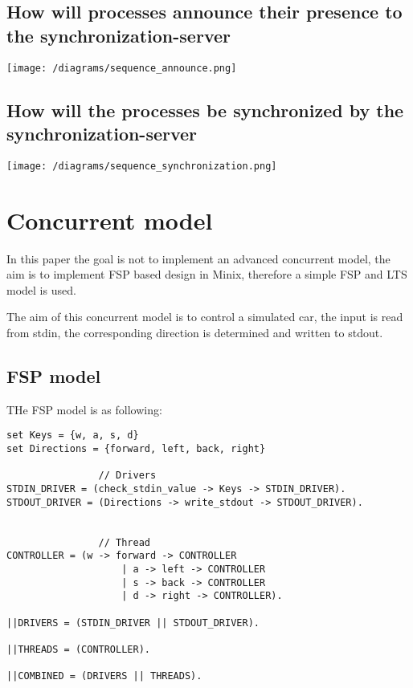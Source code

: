 \hypertarget{how-will-processes-announce-their-presence-to-the-synchronization-server}{%
\subsection{How will processes announce their presence to the
synchronization-server}\label{how-will-processes-announce-their-presence-to-the-synchronization-server}}

\texttt{[image: /diagrams/sequence\_announce.png]}

\hypertarget{how-will-the-processes-be-synchronized-by-the-synchronization-server}{%
\subsection{How will the processes be synchronized by the
synchronization-server}\label{how-will-the-processes-be-synchronized-by-the-synchronization-server}}

\texttt{[image: /diagrams/sequence\_synchronization.png]}

\hypertarget{concurrent-model}{%
\section{Concurrent model}\label{concurrent-model}}

In this paper the goal is not to implement an advanced concurrent model,
the aim is to implement FSP based design in Minix, therefore a simple
FSP and LTS model is used.

The aim of this concurrent model is to control a simulated car, the
input is read from stdin, the corresponding direction is determined and
written to stdout.

\hypertarget{fsp-model}{%
\subsection{FSP model}\label{fsp-model}}

THe FSP model is as following:

\begin{verbatim}
set Keys = {w, a, s, d}
set Directions = {forward, left, back, right} 

                // Drivers
STDIN_DRIVER = (check_stdin_value -> Keys -> STDIN_DRIVER).
STDOUT_DRIVER = (Directions -> write_stdout -> STDOUT_DRIVER).


                // Thread
CONTROLLER = (w -> forward -> CONTROLLER 
                    | a -> left -> CONTROLLER 
                    | s -> back -> CONTROLLER
                    | d -> right -> CONTROLLER).

||DRIVERS = (STDIN_DRIVER || STDOUT_DRIVER).

||THREADS = (CONTROLLER).

||COMBINED = (DRIVERS || THREADS).

\end{verbatim}

